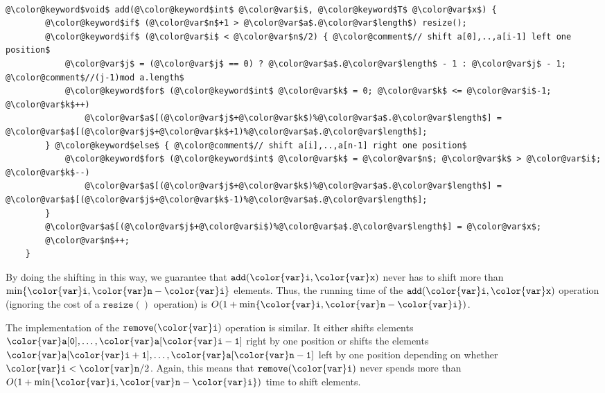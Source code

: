 \documentclass[10pt]{book}
\theoremstyle{plain}
\theoremstyle{definition}
\begin{document}
 \ \vspace{.5ex}\begin{Verbatim}[gobble=1,tabsize=2,frame=single,framerule=1.2pt,commandchars=\\@\$,label=\texttt{ArrayDeque},labelposition=topline]
	@\color@keyword$void$ add(@\color@keyword$int$ @\color@var$i$, @\color@keyword$T$ @\color@var$x$) {
		@\color@keyword$if$ (@\color@var$n$+1 > @\color@var$a$.@\color@var$length$) resize();
		@\color@keyword$if$ (@\color@var$i$ < @\color@var$n$/2) { @\color@comment$// shift a[0],..,a[i-1] left one position$
			@\color@var$j$ = (@\color@var$j$ == 0) ? @\color@var$a$.@\color@var$length$ - 1 : @\color@var$j$ - 1; @\color@comment$//(j-1)mod a.length$
			@\color@keyword$for$ (@\color@keyword$int$ @\color@var$k$ = 0; @\color@var$k$ <= @\color@var$i$-1; @\color@var$k$++)
				@\color@var$a$[(@\color@var$j$+@\color@var$k$)%@\color@var$a$.@\color@var$length$] = @\color@var$a$[(@\color@var$j$+@\color@var$k$+1)%@\color@var$a$.@\color@var$length$];
		} @\color@keyword$else$ { @\color@comment$// shift a[i],..,a[n-1] right one position$
			@\color@keyword$for$ (@\color@keyword$int$ @\color@var$k$ = @\color@var$n$; @\color@var$k$ > @\color@var$i$; @\color@var$k$--)
				@\color@var$a$[(@\color@var$j$+@\color@var$k$)%@\color@var$a$.@\color@var$length$] = @\color@var$a$[(@\color@var$j$+@\color@var$k$-1)%@\color@var$a$.@\color@var$length$];
		}
		@\color@var$a$[(@\color@var$j$+@\color@var$i$)%@\color@var$a$.@\color@var$length$] = @\color@var$x$;
		@\color@var$n$++;
	}
\end{Verbatim}


By doing the shifting in this way, we guarantee that \ensuremath{\mathtt{add({\color{var}i},{\color{var}x})}} never
has to shift more than $\min\{ \ensuremath{\mathtt{{\color{var}i}}}, \ensuremath{\mathtt{{\color{var}n}}}-\ensuremath{\mathtt{{\color{var}i}}} \}$ elements.  Thus, the running
time of the \ensuremath{\mathtt{add({\color{var}i},{\color{var}x})}} operation (ignoring the cost of a \ensuremath{\mathtt{resize()}}
operation) is $O(1+\min\{\ensuremath{\mathtt{{\color{var}i}}},\ensuremath{\mathtt{{\color{var}n}}}-\ensuremath{\mathtt{{\color{var}i}}}\})$.

The implementation of the \ensuremath{\mathtt{remove({\color{var}i})}} operation is similar.  It either
shifts elements $\ensuremath{\mathtt{{\color{var}a}[0]}},\ldots,\ensuremath{\mathtt{{\color{var}a}[{\color{var}i}-1]}}$ right by one position or shifts
the elements $\ensuremath{\mathtt{{\color{var}a}[{\color{var}i}+1]}},\ldots,\ensuremath{\mathtt{{\color{var}a}[{\color{var}n}-1]}}$ left by one position depending
on whether $\ensuremath{\mathtt{{\color{var}i}}}<\ensuremath{\mathtt{{\color{var}n}}}/2$.  Again, this means that \ensuremath{\mathtt{remove({\color{var}i})}} never spends
more than $O(1+\min\{\ensuremath{\mathtt{{\color{var}i}}},\ensuremath{\mathtt{{\color{var}n}}}-\ensuremath{\mathtt{{\color{var}i}}}\})$ time to shift elements.
\end{document}
